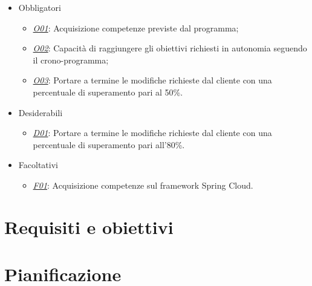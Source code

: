 \begin{itemize}[noitemsep]
	\item Obbligatori
	\begin{itemize}
		\item \underline{\textit{O01}}: Acquisizione competenze previste dal programma;
		\item \underline{\textit{O02}}: Capacità di raggiungere gli obiettivi richiesti in autonomia seguendo il crono-programma;
		\item \underline{\textit{O03}}: Portare a termine le modifiche richieste dal cliente con una percentuale di superamento pari al 50\%.
	\end{itemize}
	\item Desiderabili
	\begin{itemize}
		\item \underline{\textit{D01}}: Portare a termine le modifiche richieste dal cliente con una percentuale di superamento pari all'80\%.
	\end{itemize}
	\item Facoltativi
	\begin{itemize}
		\item \underline{\textit{F01}}: Acquisizione competenze sul framework Spring Cloud.
	\end{itemize}
\end{itemize}


%


\section{Requisiti e obiettivi}


\section{Pianificazione}

